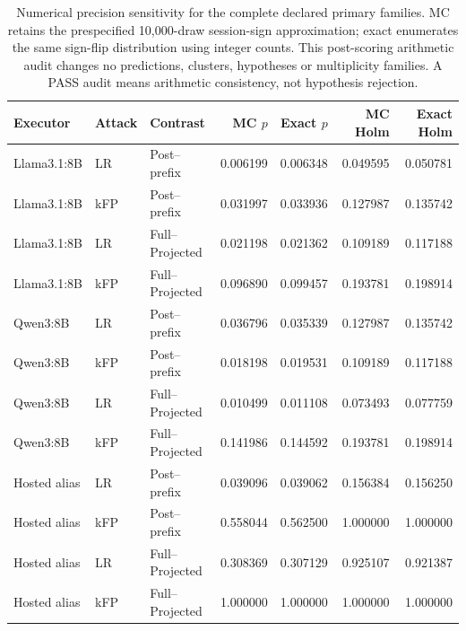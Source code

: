 \begin{table}[t]\centering\small
\caption{Numerical precision sensitivity for the complete declared primary families. MC retains the prespecified 10,000-draw session-sign approximation; exact enumerates the same sign-flip distribution using integer counts. This post-scoring arithmetic audit changes no predictions, clusters, hypotheses or multiplicity families. A PASS audit means arithmetic consistency, not hypothesis rejection.}\label{tab:randomized-sign-precision}
\setlength{\tabcolsep}{4pt}
\begin{tabularx}{\textwidth}{@{}llYrrrr@{}}\toprule
Executor & Attack & Contrast & MC $p$ & Exact $p$ & MC Holm & Exact Holm \\\midrule
Llama3.1:8B & LR & Post--prefix & 0.006199 & 0.006348 & 0.049595 & 0.050781 \\
Llama3.1:8B & kFP & Post--prefix & 0.031997 & 0.033936 & 0.127987 & 0.135742 \\
Llama3.1:8B & LR & Full--Projected & 0.021198 & 0.021362 & 0.109189 & 0.117188 \\
Llama3.1:8B & kFP & Full--Projected & 0.096890 & 0.099457 & 0.193781 & 0.198914 \\
Qwen3:8B & LR & Post--prefix & 0.036796 & 0.035339 & 0.127987 & 0.135742 \\
Qwen3:8B & kFP & Post--prefix & 0.018198 & 0.019531 & 0.109189 & 0.117188 \\
Qwen3:8B & LR & Full--Projected & 0.010499 & 0.011108 & 0.073493 & 0.077759 \\
Qwen3:8B & kFP & Full--Projected & 0.141986 & 0.144592 & 0.193781 & 0.198914 \\
Hosted alias & LR & Post--prefix & 0.039096 & 0.039062 & 0.156384 & 0.156250 \\
Hosted alias & kFP & Post--prefix & 0.558044 & 0.562500 & 1.000000 & 1.000000 \\
Hosted alias & LR & Full--Projected & 0.308369 & 0.307129 & 0.925107 & 0.921387 \\
Hosted alias & kFP & Full--Projected & 1.000000 & 1.000000 & 1.000000 & 1.000000 \\
\bottomrule\end{tabularx}
\end{table}
